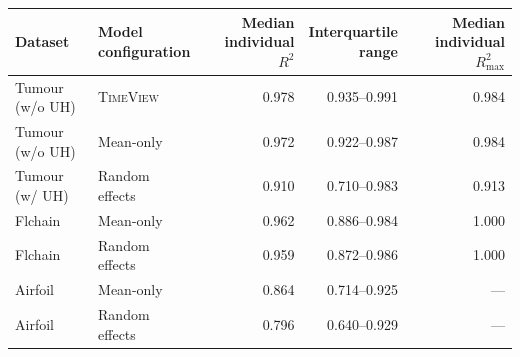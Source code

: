 \begin{tabular}{llrrr}
\toprule
Dataset & \makecell[l]{Model\\configuration} & \makecell[r]{Median\\individual $R^2$} & \makecell[r]{Interquartile\\range} & \makecell[r]{Median\\individual $R^2_{\max}$} \\
\midrule
Tumour (w/o UH) & \textsc{TimeView} & 0.978 & 0.935--0.991 & 0.984 \\
Tumour (w/o UH) & Mean-only & 0.972 & 0.922--0.987 & 0.984 \\
Tumour (w/ UH) & Random effects & 0.910 & 0.710--0.983 & 0.913 \\
Flchain & Mean-only & 0.962 & 0.886--0.984 & 1.000 \\
Flchain & Random effects & 0.959 & 0.872--0.986 & 1.000 \\
Airfoil & Mean-only & 0.864 & 0.714--0.925 & --- \\
Airfoil & Random effects & 0.796 & 0.640--0.929 & --- \\
\bottomrule
\end{tabular}
